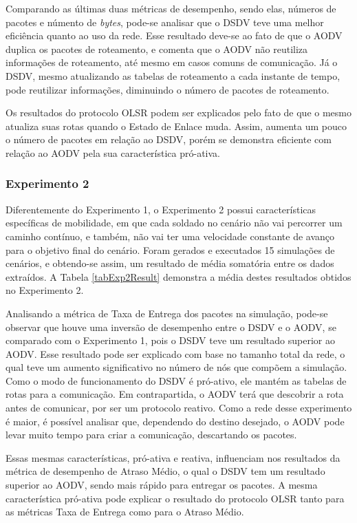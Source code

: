 Comparando as \'ultimas duas m\'etricas de desempenho, sendo elas, n\'umeros de pacotes e n\'umento de \textit{bytes}, pode-se analisar que o DSDV teve uma melhor efici\^encia quanto ao uso da rede. 
Esse resultado deve-se ao fato de que o AODV duplica os pacotes de roteamento, e \cite{ramachandran} comenta que o AODV n\~ao reutiliza informa\c{c}\~oes de roteamento, at\'e mesmo em casos comuns de comunica\c{c}\~ao.
J\'a o DSDV, mesmo atualizando as tabelas de roteamento a cada instante de tempo, pode reutilizar informa\c{c}\~oes, diminuindo o n\'umero de pacotes de roteamento. 

Os resultados do protocolo OLSR podem ser explicados pelo fato de que o mesmo atualiza suas rotas quando o Estado de Enlace muda. Assim, aumenta um pouco o n\'umero de pacotes em rela\c{c}\~ao ao DSDV, por\'em se demonstra eficiente com rela\c{c}\~ao ao AODV pela sua caracter\'istica pr\'o-ativa.

\subsubsection{Experimento 2}
Diferentemente do Experimento 1, o Experimento 2 possui caracter\'isticas espec\'ificas de mobilidade, em que cada soldado no cen\'ario n\~ao vai percorrer um caminho cont\'inuo, e tamb\'em, n\~ao vai ter uma velocidade constante de avan\c{c}o para o objetivo final do cen\'ario.
Foram gerados e executados 15 simula\c{c}\~oes de cen\'arios, e obtendo-se assim, um resultado de m\'edia somat\'oria entre os dados extra\'idos.
A Tabela \ref{tabExp2Result} demonstra a m\'edia destes resultados obtidos no Experimento 2.

Analisando a m\'etrica de Taxa de Entrega dos pacotes na simula\c{c}\~ao, pode-se observar que houve uma invers\~ao de desempenho entre o DSDV e o AODV, se comparado com o Experimento 1, pois o DSDV teve um resultado superior ao AODV.
Esse resultado pode ser explicado com base no tamanho total da rede, o qual teve um aumento significativo no n\'umero de n\'os que comp\~oem a simula\c{c}\~ao.
Como o modo de funcionamento do DSDV \'e pr\'o-ativo, ele mant\'em as tabelas de rotas para a comunica\c{c}\~ao. Em contrapartida, o AODV ter\'a que descobrir a rota antes de comunicar, por ser um protocolo reativo.
Como a rede desse experimento \'e maior, \'e poss\'ivel analisar que, dependendo do destino desejado, o AODV pode levar muito tempo para criar a comunica\c{c}\~ao, descartando os pacotes.

Essas mesmas caracter\'isticas, pr\'o-ativa e reativa, influenciam nos resultados da m\'etrica de desempenho de Atraso M\'edio, o qual o DSDV tem um resultado superior ao AODV, sendo mais r\'apido para entregar os pacotes.
A mesma caracter\'istica pr\'o-ativa pode explicar o resultado do protocolo OLSR tanto para as m\'etricas Taxa de Entrega como para o Atraso M\'edio.

